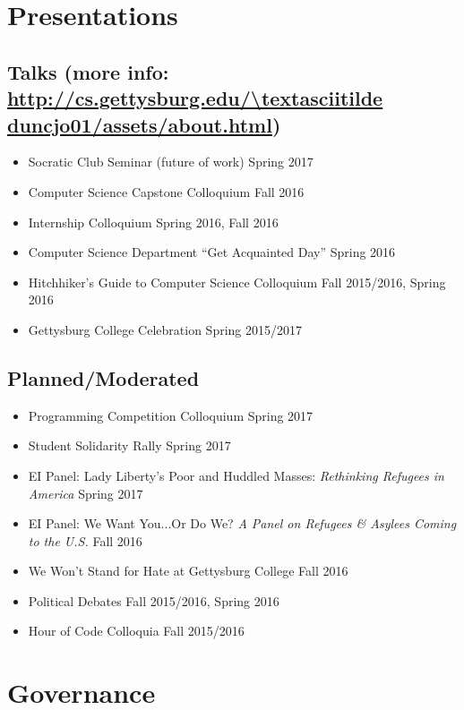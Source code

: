 \documentclass[11pt]{article}
\begin{document}
\section*{Presentations}
\subsection*{Talks (more info: \url{http://cs.gettysburg.edu/\textasciitilde duncjo01/assets/about.html})}
\begin{itemize}[noitemsep]
\item Socratic Club Seminar (future of work) \hfill Spring 2017
\item Computer Science Capstone Colloquium \hfill Fall 2016
\item Internship Colloquium \hfill Spring 2016, Fall 2016
\item Computer Science Department ``Get Acquainted Day'' \hfill Spring 2016
\item Hitchhiker's Guide to Computer Science Colloquium \hfill Fall 2015/2016, Spring 2016
\item Gettysburg College Celebration \hfill Spring 2015/2017
\end{itemize}

\subsection*{Planned/Moderated}
\begin{itemize}[noitemsep]
\item Programming Competition Colloquium \hfill Spring 2017
\item Student Solidarity Rally \hfill Spring 2017
\item EI Panel: Lady Liberty's Poor and Huddled Masses: \textit{Rethinking Refugees in America} \hfill Spring 2017
\item EI Panel: We Want You...Or Do We? \textit{A Panel on Refugees \& Asylees Coming to the U.S.} \hfill Fall 2016
\item We Won't Stand for Hate at Gettysburg College \hfill Fall 2016
\item Political Debates \hfill Fall 2015/2016, Spring 2016
\item Hour of Code Colloquia \hfill Fall 2015/2016
\end{itemize}

\section*{Governance}
\end{document}
